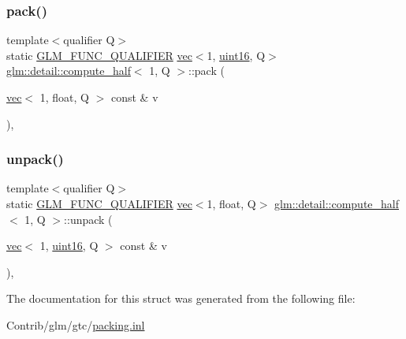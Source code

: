 \subsubsection{\texorpdfstring{pack()}{pack()}}
{\footnotesize\ttfamily template$<$qualifier Q$>$ \\
static \mbox{\hyperlink{setup_8hpp_a33fdea6f91c5f834105f7415e2a64407}{G\+L\+M\+\_\+\+F\+U\+N\+C\+\_\+\+Q\+U\+A\+L\+I\+F\+I\+ER}} \mbox{\hyperlink{structglm_1_1vec}{vec}}$<$1, \mbox{\hyperlink{namespaceglm_1_1detail_a47b2a7d006d187338e8031a352d1ce56}{uint16}}, Q$>$ \mbox{\hyperlink{structglm_1_1detail_1_1compute__half}{glm\+::detail\+::compute\+\_\+half}}$<$ 1, Q $>$\+::pack (\begin{DoxyParamCaption}\item[{\mbox{\hyperlink{structglm_1_1vec}{vec}}$<$ 1, float, Q $>$ const \&}]{v }\end{DoxyParamCaption})\hspace{0.3cm}{\ttfamily [inline]}, {\ttfamily [static]}}

\mbox{\label{structglm_1_1detail_1_1compute__half_3_011_00_01_q_01_4_a746beaa20b378bd4b7680b786c31e2c5}} 
\subsubsection{\texorpdfstring{unpack()}{unpack()}}
{\footnotesize\ttfamily template$<$qualifier Q$>$ \\
static \mbox{\hyperlink{setup_8hpp_a33fdea6f91c5f834105f7415e2a64407}{G\+L\+M\+\_\+\+F\+U\+N\+C\+\_\+\+Q\+U\+A\+L\+I\+F\+I\+ER}} \mbox{\hyperlink{structglm_1_1vec}{vec}}$<$1, float, Q$>$ \mbox{\hyperlink{structglm_1_1detail_1_1compute__half}{glm\+::detail\+::compute\+\_\+half}}$<$ 1, Q $>$\+::unpack (\begin{DoxyParamCaption}\item[{\mbox{\hyperlink{structglm_1_1vec}{vec}}$<$ 1, \mbox{\hyperlink{namespaceglm_1_1detail_a47b2a7d006d187338e8031a352d1ce56}{uint16}}, Q $>$ const \&}]{v }\end{DoxyParamCaption})\hspace{0.3cm}{\ttfamily [inline]}, {\ttfamily [static]}}



The documentation for this struct was generated from the following file\+:\begin{DoxyCompactItemize}
\item 
Contrib/glm/gtc/\mbox{\hyperlink{packing_8inl}{packing.\+inl}}\end{DoxyCompactItemize}
